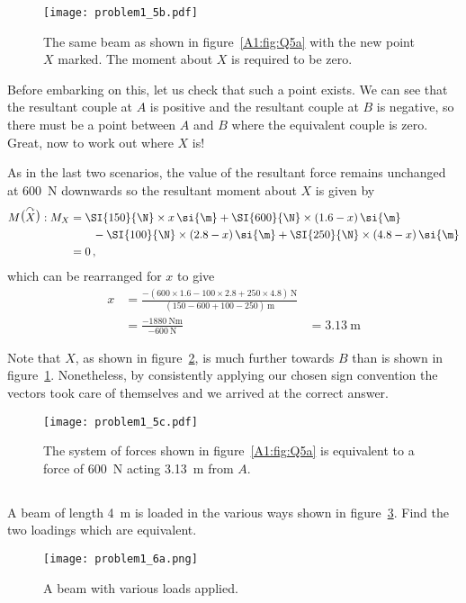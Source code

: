 \documentclass[a4paper,justified,oneside]{tufte-handout}
\numberwithin{equation}{subsection}
\begin{document}
\begin{solution}
\begin{figure}
	\centering
	\texttt{[image: problem1\_5b.pdf]}
	\caption{The same beam as shown in figure~\protect\ref{A1:fig:Q5a} with the new point $X$ marked. The moment about $X$ is required to be zero.}
	\label{A1:fig:Q5b}
\end{figure}

Before embarking on this, let us check that such a point exists. We can see that the resultant couple at $A$ is positive and the resultant couple at $B$ is negative, so there must be a point between $A$ and $B$ where the equivalent couple is zero. Great, now to work out where $X$ is!

As in the last two scenarios, the value of the resultant force remains unchanged at \SI{600}{\N} downwards so the resultant moment about $X$ is given by
\begin{align*}
	M\raisebox{1.5pt}{\big(}\overset{\curvearrowright}{X}\raisebox{1.5pt}{\big)}: M_X 	&=	\SI{150}{\N}\times x \, \si{\m} + \SI{600}{\N}\times (1.6-x) \, \si{\m}\\
																						&\qquad	- \SI{100}{\N}\times (2.8-x) \, \si{\m} + \SI{250}{\N} \times (4.8-x) \, \si{\m}	\\
																						&=	0\,,
\end{align*}
which can be rearranged for $x$ to give
\begin{align}
	x	&=	\frac{-(600\times 1.6 -100\times 2.8 + 250\times 4.8)\, \si{\N}}{(150 -600 +100-250) \, \si{\m}}	\\
		&=	\frac{\SI{-1880}{\N\m}}{\SI{-600}{\N}}
		&=	\SI{3.13}{\m}
\end{align}

Note that $X$, as shown in figure~\ref{A1:fig:Q5c}, is much further towards $B$ than is shown in figure~\ref{A1:fig:Q5b}. Nonetheless, by consistently applying our chosen sign convention the vectors took care of themselves and we arrived at the correct answer.
\begin{figure}
	\centering
	\texttt{[image: problem1\_5c.pdf]}
	\caption{The system of forces shown in figure~\protect\ref{A1:fig:Q5a} is equivalent to a force of \SI{600}{\N} acting \SI{3.13}{\m} from $A$.}
	\label{A1:fig:Q5c}
\end{figure}
\clearpage
\end{solution}

\subsection{}
A beam of length \SI{4}{\m} is loaded in the various ways shown in figure~\ref{A1:fig:Q6a}. Find the two loadings which are equivalent.
\begin{figure}
	\centering
	\texttt{[image: problem1\_6a.png]}
	\caption{A beam with various loads applied.}
	\label{A1:fig:Q6a}
\end{figure}
\end{document}

